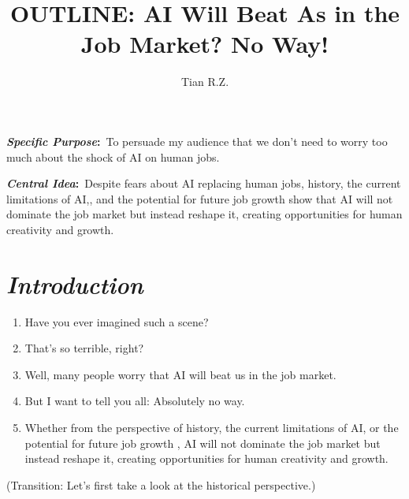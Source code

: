 \documentclass{article}
\title{OUTLINE: AI Will Beat As in the Job Market? No Way!}
\author{Tian R.Z.}
\begin{document}
\maketitle

\textbf{\textit{Specific Purpose}:}~To persuade my audience that we 
don’t need to worry too much about the shock of AI on human jobs.\newline

\textbf{\textit{Central Idea}:}~Despite fears about AI 
replacing human jobs, history, the current limitations of AI,, 
and the potential for future job growth show that AI will
 not dominate the job market but instead reshape it, creating 
 opportunities for human creativity and growth.

\section{\textit{Introduction}}
\begin{enumerate}
      \renewcommand{\labelenumi}{\Roman{enumi}.}  %
      \item Have you ever imagined such a scene? 
      \item That's so terrible, right? 
      \item Well, many people worry that AI will beat 
      us in the job market.
      \item But I want to tell you all: Absolutely no way.
      \item Whether from the perspective of history,
       the current limitations of AI, or the potential for future job growth
       , AI will not dominate the job market but instead reshape it, creating 
       opportunities for human creativity and growth.
\end{enumerate}
(Transition: Let's first take a look at the historical perspective.)
\end{document}

